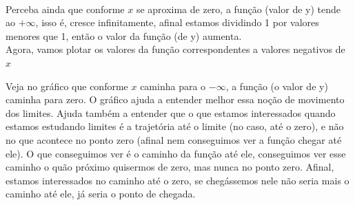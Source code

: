 \documentclass{article}
\begin{document}
\\[2pt]
Perceba ainda que conforme $x$ se aproxima de zero, a função (valor de y) tende ao $+\infty$, isso é, cresce infinitamente, afinal estamos dividindo 1 por valores menores que 1, então o valor da função (de y) aumenta.
\\[2pt]
Agora, vamos plotar os valores da função correspondentes a valores negativos de $x$
\begin{center}
\end{center}
Veja no gráfico que conforme $x$ caminha para o $-\infty$, a função (o valor de y) caminha para zero. O gráfico ajuda a entender melhor essa noção de movimento dos limites. Ajuda também a entender que o que estamos interessados quando estamos estudando limites é a trajetória até o limite (no caso, até o zero), e não no que acontece no ponto zero (afinal nem conseguimos ver a função chegar até ele). O que conseguimos ver é o caminho da função até ele, conseguimos ver esse caminho o quão próximo quisermos de zero, mas nunca no ponto zero. Afinal, estamos interessados no caminho até o zero, se chegássemos nele não seria mais o caminho até ele, já seria o ponto de chegada. 
\end{document}
